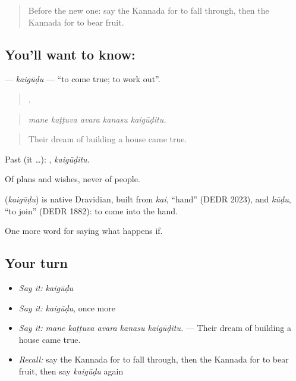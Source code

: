 \label{lesson:KA-C419-kaigudu}



\begin{quote}
Before the new one: say the Kannada for to fall through, then the Kannada for to bear fruit.
\end{quote}

\subsection*{You'll want to know: }
\textbf{} — \emph{kaigūḍu} — \textquotedblleft{}to come true; to work out\textquotedblright{}.

\begin{quote}
    .
\end{quote}

\begin{quote}
\emph{mane kaṭṭuva avara kanasu kaigūḍitu.}
\end{quote}

\begin{quote}
Their dream of building a house came true.
\end{quote}

Past (it …): , \emph{kaigūḍitu}.

Of plans and wishes, never of people.

\begin{cousinweb}
\textbf{} (\emph{kaigūḍu}) is native Dravidian, built from \emph{kai}, \textquotedblleft{}hand\textquotedblright{} (DEDR 2023), and \emph{kūḍu}, \textquotedblleft{}to join\textquotedblright{} (DEDR 1882): to come into the hand.
\end{cousinweb}

\begin{grammarlens}[title={What you've built}]
One more word for saying what happens if.
\end{grammarlens}

\subsection*{Your turn}
\begin{itemize}
\raggedright
  \item \emph{Say it:} \emph{kaigūḍu}
  \item \emph{Say it:} \emph{kaigūḍu}, once more
  \item \emph{Say it:} \emph{mane kaṭṭuva avara kanasu kaigūḍitu.} — Their dream of building a house came true.
  \item \emph{Recall:} say the Kannada for to fall through, then the Kannada for to bear fruit, then say \emph{kaigūḍu} again
\end{itemize}

